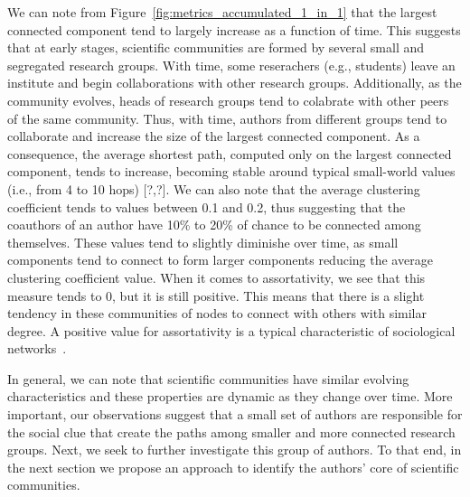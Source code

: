We can note from Figure~\ref{fig:metrics_accumulated_1_in_1} that the largest connected component tend to largely increase as a function of time. This suggests that at early stages, scientific communities are formed by several small and segregated research groups. With time, some reserachers (e.g., students) leave an institute and begin collaborations with other research groups. Additionally, as the community evolves, heads of  research groups tend to colabrate with other peers of the same community. Thus, with time, authors from different groups tend to collaborate and increase the size of the largest connected component. As a consequence, the average shortest path, computed only on the largest connected component, tends to increase, becoming stable around typical small-world values (i.e., from 4 to 10 hops) [?,?].  We can also note that the average clustering coefficient tends to values between 0.1 and 0.2, thus suggesting that the coauthors of an author have 10\% to 20\% of chance to
be connected among themselves. These values tend to slightly diminishe over time, as small components tend to connect to form larger components reducing the average clustering coefficient value.  When it comes to assortativity, we see that this measure tends to 0, but it is still positive. This means that there is a slight tendency in these communities of nodes to connect with others with similar degree.  A positive value for assortativity is a typical characteristic of sociological networks~\cite{Newman2003}.

In general, we can note that scientific communities have similar evolving characteristics and these properties are dynamic as they change over time.  More important, our observations suggest that a small set of authors are responsible for the social clue that create the paths among smaller and more connected research groups. Next, we seek to further investigate this group of authors. To that end, in the next section we propose an approach to identify the authors' core of scientific communities.



